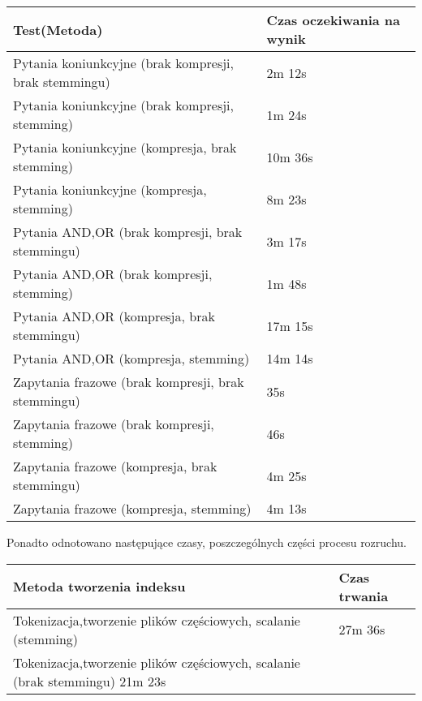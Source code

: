 \documentclass[11pt,leqno]{article}
\begin{document}
\begin{tabular}{|l|l|}
\hline
Test(Metoda) & Czas oczekiwania na wynik\\
\hline
Pytania koniunkcyjne (brak kompresji, brak stemmingu) & 2m 12s\\
Pytania koniunkcyjne (brak kompresji, stemming) & 1m 24s\\
Pytania koniunkcyjne (kompresja, brak stemming) & 10m 36s\\
Pytania koniunkcyjne (kompresja, stemming) & 8m 23s\\
Pytania AND,OR (brak kompresji, brak stemmingu) & 3m 17s\\
Pytania AND,OR (brak kompresji, stemming) & 1m 48s\\
Pytania AND,OR (kompresja, brak stemmingu) & 17m 15s\\
Pytania AND,OR (kompresja, stemming) & 14m 14s\\
Zapytania frazowe (brak kompresji, brak stemmingu) & 35s\\
Zapytania frazowe (brak kompresji, stemming) & 46s\\
Zapytania frazowe (kompresja, brak stemmingu) & 4m 25s\\
Zapytania frazowe (kompresja, stemming) & 4m 13s\\
\hline
\end{tabular}

Ponadto odnotowano następujące czasy, poszczególnych części procesu rozruchu.

\begin{tabular}{|l|l|}
\hline
Metoda tworzenia indeksu & Czas trwania\\
\hline
Tokenizacja,tworzenie plików częściowych, scalanie (stemming) & 27m 36s\\
Tokenizacja,tworzenie plików częściowych, scalanie (brak stemmingu) 21m 23s& \\
\hline

\end{tabular}
\end{document}
